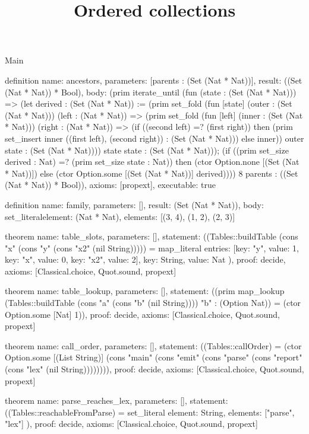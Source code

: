 \begin{lexlean}{Main}
\title{Ordered collections}
\begin{semanticmodule}
definition{
  name: ancestors,
  parameters: [parents : (Set (Nat * Nat))],
  result: ((Set (Nat * Nat)) * Bool),
  body: (prim iterate_until (fun (state : (Set (Nat * Nat))) => (let derived : (Set (Nat * Nat)) := (prim set_fold (fun [state] (outer : (Set (Nat * Nat))) (left : (Nat * Nat)) => (prim set_fold (fun [left] (inner : (Set (Nat * Nat))) (right : (Nat * Nat)) => (if ((second left) =? (first right)) then (prim set_insert inner ((first left), (second right)) : (Set (Nat * Nat))) else inner)) outer state : (Set (Nat * Nat)))) state state : (Set (Nat * Nat))); (if ((prim set_size derived : Nat) =? (prim set_size state : Nat)) then (ctor Option.none [(Set (Nat * Nat))]) else (ctor Option.some [(Set (Nat * Nat))] derived)))) 8 parents : ((Set (Nat * Nat)) * Bool)),
  axioms: [propext],
  executable: true
}

definition{
  name: family,
  parameters: [],
  result: (Set (Nat * Nat)),
  body: set_literal{element: (Nat * Nat), elements: [(3, 4), (1, 2), (2, 3)]}
}

theorem{
  name: table_slots,
  parameters: [],
  statement: ((Tables::buildTable (cons "x" (cons "y" (cons "x2" (nil String))))) = map_literal{
    entries: [{key: "y", value: 1}, {key: "x", value: 0}, {key: "x2", value: 2}],
    key: String,
    value: Nat
  }),
  proof: decide{},
  axioms: [Classical.choice, Quot.sound, propext]
}

theorem{
  name: table_lookup,
  parameters: [],
  statement: ((prim map_lookup (Tables::buildTable (cons "a" (cons "b" (nil String)))) "b" : (Option Nat)) = (ctor Option.some [Nat] 1)),
  proof: decide{},
  axioms: [Classical.choice, Quot.sound, propext]
}

theorem{
  name: call_order,
  parameters: [],
  statement: ((Tables::callOrder) = (ctor Option.some [(List String)] (cons "main" (cons "emit" (cons "parse" (cons "report" (cons "lex" (nil String)))))))),
  proof: decide{},
  axioms: [Classical.choice, Quot.sound, propext]
}

theorem{
  name: parse_reaches_lex,
  parameters: [],
  statement: ((Tables::reachableFromParse) = set_literal{
    element: String,
    elements: ["parse", "lex"]
  }),
  proof: decide{},
  axioms: [Classical.choice, Quot.sound, propext]
}


\end{semanticmodule}
\end{lexlean}

